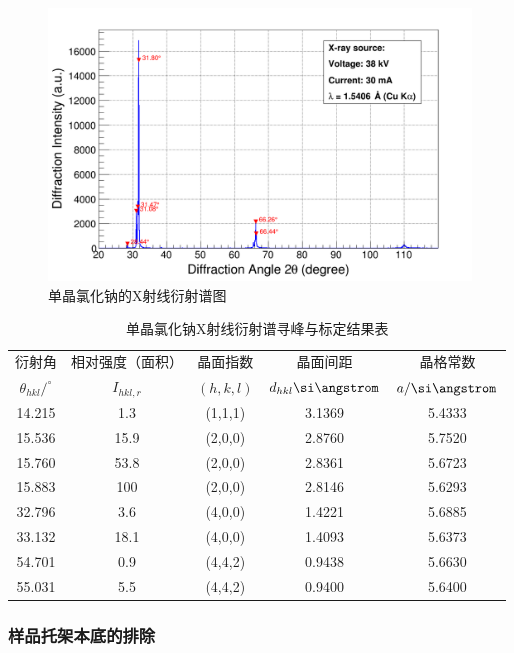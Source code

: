 \documentclass{thuemp}
\begin{document}
\begin{figure}[H]
    \centering
    \includegraphics[width=0.8\linewidth]{../Data/NaCl-single.png}
    \caption{单晶氯化钠的X射线衍射谱图}
    \label{fig:nacl_xrd_single}
\end{figure}

\begin{table}[H]
    \centering
    \captionnamefont{\wuhao\bf\heiti}
    \captiontitlefont{\wuhao\bf\heiti}
    \caption{单晶氯化钠X射线衍射谱寻峰与标定结果表}
    \label{tab:nacl_xrd_single}
    \begin{tabular}{ccccc}
        \toprule
        衍射角 & 相对强度（面积）& 晶面指数 & 晶面间距 & 晶格常数 \\
        $\theta_{hkl}/^\circ$ & $I_{hkl,r}$ & $(h,k,l)$ & $d_{hkl}\text{\si\angstrom}$ & $a/\text{\si\angstrom}$ \\
        \midrule
        14.215 &  1.3 & (1,1,1) & 3.1369 & 5.4333\\
        15.536 & 15.9 & (2,0,0) & 2.8760 & 5.7520\\
        15.760 & 53.8 & (2,0,0) & 2.8361 & 5.6723\\
        15.883 &  100 & (2,0,0) & 2.8146 & 5.6293\\
        32.796 &  3.6 & (4,0,0) & 1.4221 & 5.6885\\
        33.132 & 18.1 & (4,0,0) & 1.4093 & 5.6373\\
        54.701 &  0.9 & (4,4,2) & 0.9438 & 5.6630\\
        55.031 &  5.5 & (4,4,2) & 0.9400 & 5.6400\\
        \bottomrule
    \end{tabular}
\end{table}

\subsubsection{样品托架本底的排除}
\end{document}
